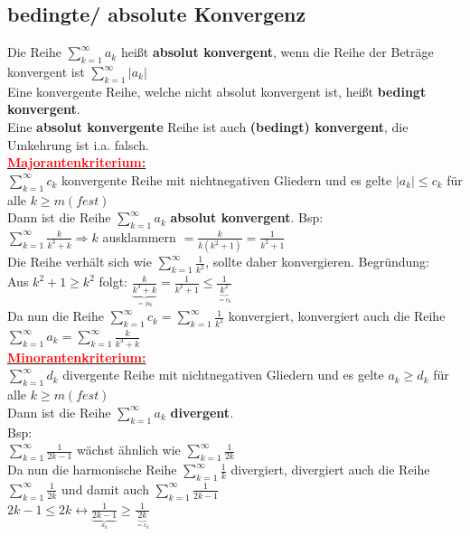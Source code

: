 \documentclass[12pt,a4paper]{article}
\begin{document}
\subsection{bedingte/ absolute Konvergenz}
Die Reihe $\sum\limits_{k=1}^{\infty}a_k$ heißt \textbf{absolut konvergent}, wenn die Reihe der Beträge konvergent ist $\sum\limits_{k=1}^{\infty}|a_k|$
\\
Eine konvergente Reihe, welche nicht absolut konvergent ist, heißt \textbf{bedingt konvergent}.
\\Eine \textbf{absolut konvergente} Reihe ist auch \textbf{(bedingt) konvergent}, die Umkehrung ist i.a. falsch.
\\\underline{\textbf{\textcolor{red}{Majorantenkriterium:}}}\\
$\sum\limits_{k=1}^{\infty}c_k$ konvergente Reihe mit nichtnegativen Gliedern und es gelte $|a_k|\leq c_k$ für alle $k\geq m (fest)$\\
Dann ist die Reihe $\sum\limits_{k=1}^{\infty}a_k$ \textbf{absolut konvergent}.
Bsp:\\
$\sum\limits_{k=1}^{\infty}\frac{k}{k^3+k} \Rightarrow k$ ausklammern $= \frac{k}{k(k^2+1)}=\frac{1}{k^2+1}$
\\Die Reihe verhält sich wie $\sum\limits_{k=1}^{\infty}\frac{1}{k^2}$, sollte daher konvergieren. Begründung:
\\Aus $k^2+1 \geq k^2$ folgt: $\frac{k}{\underbrace{k^3+k}_{=|a_k}}=\frac{1}{k^2+1}\leq \frac{1}{\underbrace{k^2}_{=c_k}}$ 
\\Da nun die Reihe $\sum\limits_{k=1}^{\infty}c_k=\sum\limits_{k=1}^{\infty}\frac{1}{k^2}$ konvergiert, konvergiert auch die Reihe $\sum\limits_{k=1}^{\infty}a_k=\sum\limits_{k=1}^{\infty}\frac{k}{k^3+k}$
\\\underline{\textbf{\textcolor{red}{Minorantenkriterium:}}}\\
$\sum\limits_{k=1}^{\infty}d_k$ divergente Reihe mit nichtnegativen Gliedern und es gelte $a_k\geq d_k$ für alle $k\geq m (fest)$\\
Dann ist die Reihe $\sum\limits_{k=1}^{\infty}a_k$ \textbf{divergent}.
\\Bsp:\\
$\sum\limits_{k=1}^{\infty}\frac{1}{2k-1}$ wächst ähnlich wie $\sum\limits_{k=1}^{\infty}\frac{1}{2k}$\\
Da nun die harmonische Reihe $\sum\limits_{k=1}^{\infty}\frac{1}{k}$ divergiert, divergiert auch die Reihe $\sum\limits_{k=1}^{\infty}\frac{1}{2k}$ und damit auch $\sum\limits_{k=1}^{\infty}\frac{1}{2k-1}$
\\$2k-1\leq 2k \leftrightarrow \frac{1}{\underbrace{2k-1}_{a_k}}\geq \frac{1}{\underbrace{2k}_{=c_k}}$
\end{document}
